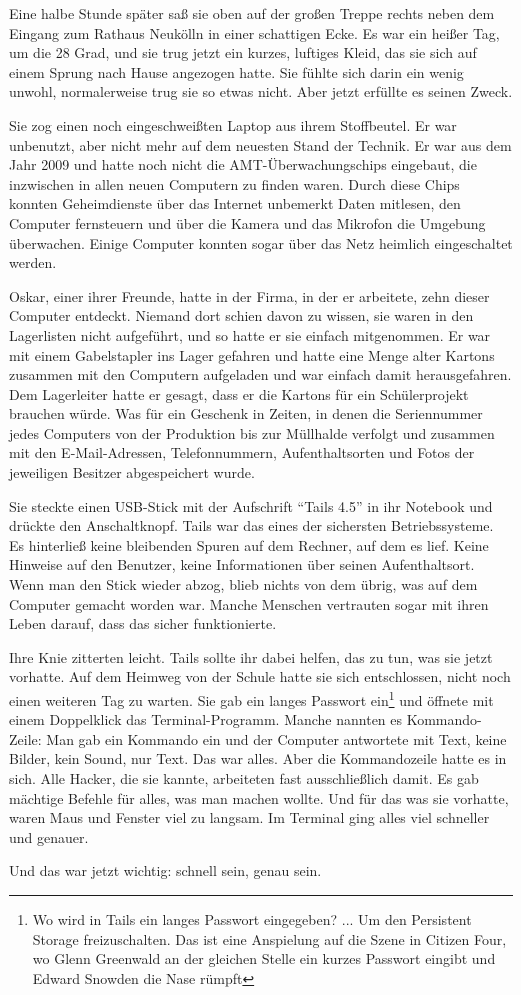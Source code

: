 Eine halbe Stunde später saß sie oben auf der großen Treppe rechts neben dem Eingang zum Rathaus Neukölln in einer schattigen Ecke.
Es war ein heißer Tag, um die 28 Grad, und sie trug jetzt ein kurzes, luftiges Kleid, das sie sich auf einem Sprung nach Hause angezogen hatte.
Sie fühlte sich darin ein wenig unwohl, normalerweise trug sie so etwas nicht.
Aber jetzt erfüllte es seinen Zweck.

Sie zog einen noch eingeschweißten Laptop aus ihrem Stoffbeutel.
Er war unbenutzt, aber nicht mehr auf dem neuesten Stand der Technik.
Er war aus dem Jahr 2009 und hatte noch nicht die AMT-Überwachungschips eingebaut, die inzwischen in allen neuen Computern zu finden waren.
Durch diese Chips konnten Geheimdienste über das Internet unbemerkt Daten mitlesen, den Computer fernsteuern und über die Kamera und das Mikrofon die Umgebung überwachen.
Einige Computer konnten sogar über das Netz heimlich eingeschaltet werden.

Oskar, einer ihrer Freunde, hatte in der Firma, in der er arbeitete, zehn dieser Computer entdeckt.
Niemand dort schien davon zu wissen, sie waren in den Lagerlisten nicht aufgeführt, und so hatte er sie einfach mitgenommen.
Er war mit einem Gabelstapler ins Lager gefahren und hatte eine Menge alter Kartons zusammen mit den Computern aufgeladen und war einfach damit herausgefahren.
Dem Lagerleiter hatte er gesagt, dass er die Kartons für ein Schülerprojekt brauchen würde.
Was für ein Geschenk in Zeiten, in denen die Seriennummer jedes Computers von der Produktion bis zur Müllhalde verfolgt und zusammen mit den E-Mail-Adressen, Telefonnummern, Aufenthaltsorten und Fotos der jeweiligen Besitzer abgespeichert wurde.

Sie steckte einen USB-Stick mit der Aufschrift \enquote{Tails 4.5} in ihr Notebook und drückte den Anschaltknopf.
Tails war das eines der sichersten Betriebssysteme.
Es hinterließ keine bleibenden Spuren auf dem Rechner, auf dem es lief.
Keine Hinweise auf den Benutzer, keine Informationen über seinen Aufenthaltsort.
Wenn man den Stick wieder abzog, blieb nichts von dem übrig, was auf dem Computer gemacht worden war.
Manche Menschen vertrauten sogar mit ihren Leben darauf, dass das sicher funktionierte.

Ihre Knie zitterten leicht.
Tails sollte ihr dabei helfen, das zu tun, was sie jetzt vorhatte.
Auf dem Heimweg von der Schule hatte sie sich entschlossen, nicht noch einen weiteren Tag zu warten.
Sie gab ein langes Passwort ein\footnote{Wo wird in Tails ein langes Passwort eingegeben? ... Um den Persistent Storage freizuschalten. Das ist eine Anspielung auf die Szene in Citizen Four, wo Glenn Greenwald an der gleichen Stelle ein kurzes Passwort eingibt und Edward Snowden die Nase rümpft} und öffnete mit einem Doppelklick das Terminal-Programm.
Manche nannten es Kommando-Zeile: Man gab ein Kommando ein und der Computer antwortete mit Text, keine Bilder, kein Sound, nur Text.
Das war alles.
Aber die Kommandozeile hatte es in sich.
Alle Hacker, die sie kannte, arbeiteten fast ausschließlich damit.
Es gab mächtige Befehle für alles, was man machen wollte.
Und für das was sie vorhatte, waren Maus und Fenster viel zu langsam.
Im Terminal ging alles viel schneller und genauer.

Und das war jetzt wichtig: schnell sein, genau sein.
